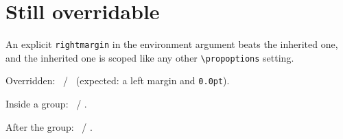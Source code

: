 \documentclass{article}
\newcommand\lr{\the\leftmargin\ / \the\rightmargin}
\begin{document}
\section{Still overridable}

An explicit \texttt{rightmargin} in the environment argument beats the
inherited one, and the inherited one is scoped like any other
\verb|\propoptions| setting.

\begin{prop}[rightmargin=0pt]
  \item Overridden: \lr\ (expected: a left margin and \texttt{0.0pt}).
\end{prop}

{
\begin{prop}
  \item Inside a group: \lr.
\end{prop}}

\begin{prop}
  \item After the group: \lr.
\end{prop}
\end{document}
